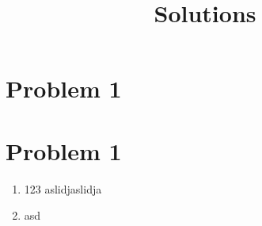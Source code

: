 \documentclass{article}
\begin{document}


\section*{Problem 1}

\section*{Problem 1}
\title{Solutions}
\begin{enumerate}
        \item 123
aslidjaslidja
        \item asd

\end{enumerate}
\end{document}
